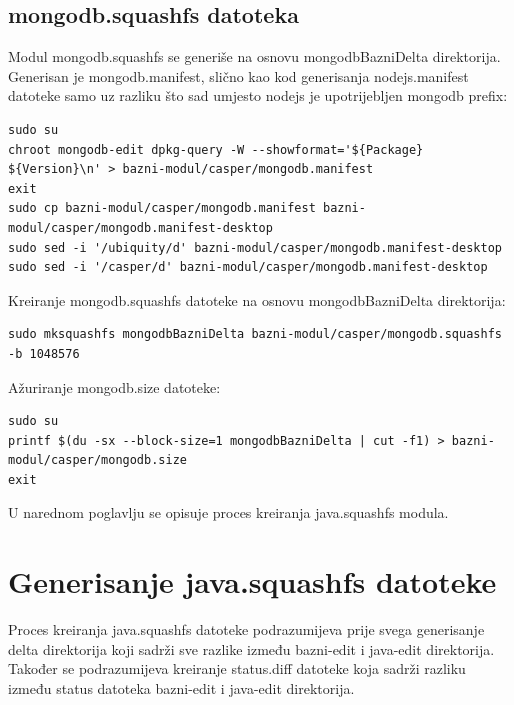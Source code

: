 \documentclass[12pt,vi]{mitthesis}
\begin{document}
\subsection*{mongodb.squashfs datoteka}
\indent
Modul mongodb.squashfs se generiše na osnovu mongodbBazniDelta direktorija. Generisan je mongodb.manifest, slično kao kod generisanja nodejs.manifest datoteke samo uz razliku što sad umjesto nodejs je upotrijebljen mongodb prefix:
\begin{lstlisting}[style=BashInputStyle]
sudo su
chroot mongodb-edit dpkg-query -W --showformat='${Package} ${Version}\n' > bazni-modul/casper/mongodb.manifest
exit
sudo cp bazni-modul/casper/mongodb.manifest bazni-modul/casper/mongodb.manifest-desktop
sudo sed -i '/ubiquity/d' bazni-modul/casper/mongodb.manifest-desktop
sudo sed -i '/casper/d' bazni-modul/casper/mongodb.manifest-desktop
\end{lstlisting}
\noindent
Kreiranje mongodb.squashfs datoteke na osnovu mongodbBazniDelta direktorija:
\begin{lstlisting}[style=BashInputStyle] 
sudo mksquashfs mongodbBazniDelta bazni-modul/casper/mongodb.squashfs -b 1048576
\end{lstlisting}
\noindent
Ažuriranje mongodb.size datoteke:
\begin{lstlisting}[style=BashInputStyle]
sudo su
printf $(du -sx --block-size=1 mongodbBazniDelta | cut -f1) > bazni-modul/casper/mongodb.size
exit
\end{lstlisting}
U narednom poglavlju se opisuje proces kreiranja java.squashfs modula.
\section*{Generisanje java.squashfs datoteke}
\indent
Proces kreiranja java.squashfs datoteke podrazumijeva prije svega generisanje delta direktorija koji sadrži sve razlike između bazni-edit i java-edit direktorija. Također se podrazumijeva kreiranje status.diff datoteke koja sadrži razliku između status datoteka bazni-edit i java-edit direktorija.\\
\end{document}
